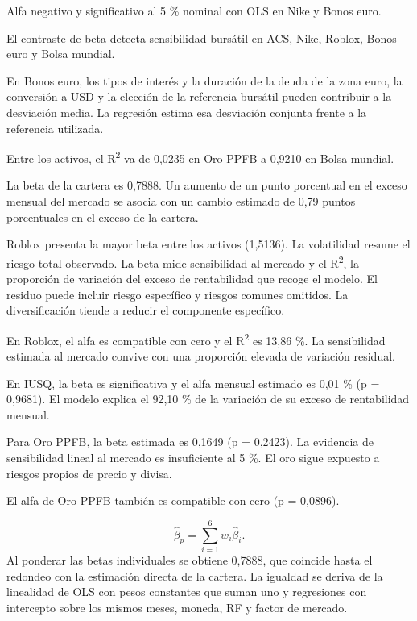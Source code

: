 \documentclass[11pt,a4paper]{article}
\begin{document}
Alfa negativo y significativo al 5 \% nominal con OLS en Nike y Bonos euro.

El contraste de beta detecta sensibilidad bursátil en ACS, Nike, Roblox, Bonos euro y Bolsa mundial.

En Bonos euro, los tipos de interés y la duración de la deuda de la zona euro, la conversión a USD y la elección de la referencia bursátil pueden contribuir a la desviación media. La regresión estima esa desviación conjunta frente a la referencia utilizada.

Entre los activos, el R\textsuperscript{2} va de 0,0235 en Oro PPFB a 0,9210 en Bolsa mundial.

La beta de la cartera es 0,7888. Un aumento de un punto porcentual en el exceso mensual del mercado se asocia con un cambio estimado de 0,79 puntos porcentuales en el exceso de la cartera.

Roblox presenta la mayor beta entre los activos (1,5136). La volatilidad resume el riesgo total observado. La beta mide sensibilidad al mercado y el R\textsuperscript{2}, la proporción de variación del exceso de rentabilidad que recoge el modelo. El residuo puede incluir riesgo específico y riesgos comunes omitidos. La diversificación tiende a reducir el componente específico.

En Roblox, el alfa es compatible con cero y el R\textsuperscript{2} es 13,86 \%. La sensibilidad estimada al mercado convive con una proporción elevada de variación residual.

En IUSQ, la beta es significativa y el alfa mensual estimado es 0,01 \% (p = 0,9681). El modelo explica el 92,10 \% de la variación de su exceso de rentabilidad mensual.

Para Oro PPFB, la beta estimada es 0,1649 (p = 0,2423). La evidencia de sensibilidad lineal al mercado es insuficiente al 5 \%. El oro sigue expuesto a riesgos propios de precio y divisa.

El alfa de Oro PPFB también es compatible con cero (p = 0,0896).

\[\widehat\beta_p=\sum_{i=1}^{6}w_i\widehat\beta_i.\]
Al ponderar las betas individuales se obtiene 0,7888, que coincide hasta el redondeo con la estimación directa de la cartera. La igualdad se deriva de la linealidad de OLS con pesos constantes que suman uno y regresiones con intercepto sobre los mismos meses, moneda, RF y factor de mercado.
\end{document}
